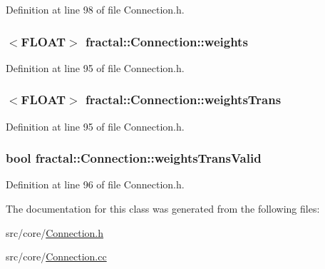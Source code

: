 Definition at line 98 of file Connection.\+h.

\hypertarget{classfractal_1_1Connection_a44f908ab921162e57108b5b6854e2ab0}{
\subsubsection[{weights}]{$<${\bf F\+L\+O\+A\+T}$>$ fractal\+::\+Connection\+::weights\hspace{0.3cm}{\ttfamily [protected]}}}\label{classfractal_1_1Connection_a44f908ab921162e57108b5b6854e2ab0}


Definition at line 95 of file Connection.\+h.

\hypertarget{classfractal_1_1Connection_a1df1793ca8ec947b29841138023e4ce7}{
\subsubsection[{weights\+Trans}]{$<${\bf F\+L\+O\+A\+T}$>$ fractal\+::\+Connection\+::weights\+Trans\hspace{0.3cm}{\ttfamily [protected]}}}\label{classfractal_1_1Connection_a1df1793ca8ec947b29841138023e4ce7}


Definition at line 95 of file Connection.\+h.

\hypertarget{classfractal_1_1Connection_a22c55c2a935e38469f00cd7502d5bb0f}{
\subsubsection[{weights\+Trans\+Valid}]{\setlength{\rightskip}{0pt plus 5cm}bool fractal\+::\+Connection\+::weights\+Trans\+Valid\hspace{0.3cm}{\ttfamily [protected]}}}\label{classfractal_1_1Connection_a22c55c2a935e38469f00cd7502d5bb0f}


Definition at line 96 of file Connection.\+h.



The documentation for this class was generated from the following files\+:\begin{DoxyCompactItemize}
\item 
src/core/\hyperlink{Connection_8h}{Connection.\+h}\item 
src/core/\hyperlink{Connection_8cc}{Connection.\+cc}\end{DoxyCompactItemize}
